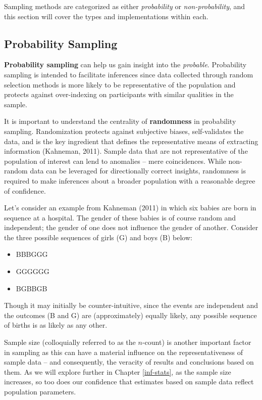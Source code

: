 \documentclass[
]{book}
\providecommand{\tightlist}{%
  \setlength{\itemsep}{0pt}\setlength{\parskip}{0pt}}
\begin{document}
Sampling methods are categorized as either \emph{probability} or \emph{non-probability}, and this section will cover the types and implementations within each.

\hypertarget{probability-sampling}{%
\subsection{Probability Sampling}\label{probability-sampling}}

\textbf{Probability sampling} can help us gain insight into the \emph{probable}. Probability sampling is intended to facilitate inferences since data collected through random selection methods is more likely to be representative of the population and protects against over-indexing on participants with similar qualities in the sample.

It is important to understand the centrality of \textbf{randomness} in probability sampling. Randomization protects against subjective biases, self-validates the data, and is the key ingredient that defines the representative means of extracting information (Kahneman, 2011). Sample data that are not representative of the population of interest can lend to anomalies -- mere coincidences. While non-random data can be leveraged for directionally correct insights, randomness is required to make inferences about a broader population with a reasonable degree of confidence.

Let's consider an example from Kahneman (2011) in which six babies are born in sequence at a hospital. The gender of these babies is of course random and independent; the gender of one does not influence the gender of another. Consider the three possible sequences of girls (G) and boys (B) below:

\begin{itemize}
\tightlist
\item
  BBBGGG
\item
  GGGGGG
\item
  BGBBGB
\end{itemize}

Though it may initially be counter-intuitive, since the events are independent and the outcomes (B and G) are (approximately) equally likely, any possible sequence of births is as likely as any other.

Sample size (colloquially referred to as the \(n\)-count) is another important factor in sampling as this can have a material influence on the representativeness of sample data -- and consequently, the veracity of results and conclusions based on them. As we will explore further in Chapter \ref{inf-stats}, as the sample size increases, so too does our confidence that estimates based on sample data reflect population parameters.
\end{document}
